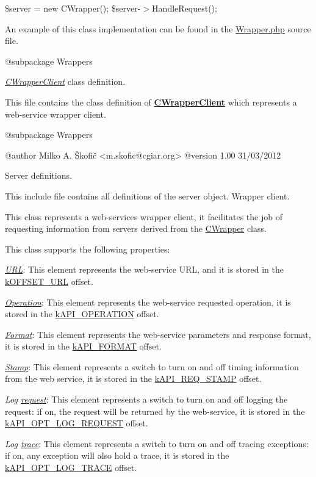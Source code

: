 {\ttfamily  \$server = new C\-Wrapper(); \$server-\/$>$Handle\-Request(); }

An example of this class implementation can be found in the \hyperlink{}{Wrapper.\-php} source file.

\begin{DoxyVerb}    @subpackage     Wrappers\end{DoxyVerb}


{\itshape \hyperlink{class_c_wrapper_client}{C\-Wrapper\-Client}} class definition.

This file contains the class definition of {\bfseries \hyperlink{class_c_wrapper_client}{C\-Wrapper\-Client}} which represents a web-\/service wrapper client.

\begin{DoxyVerb}    @subpackage     Wrappers

    @author         Milko A. Škofič <m.skofic@cgiar.org>
    @version        1.00 31/03/2012\end{DoxyVerb}


Server definitions.

This include file contains all definitions of the server object. Wrapper client.

This class represents a web-\/services wrapper client, it facilitates the job of requesting information from servers derived from the \hyperlink{class_c_wrapper}{C\-Wrapper} class.

This class supports the following properties\-:


\begin{DoxyItemize}
\item {\itshape \hyperlink{}{U\-R\-L}}\-: This element represents the web-\/service U\-R\-L, and it is stored in the \hyperlink{}{k\-O\-F\-F\-S\-E\-T\-\_\-\-U\-R\-L} offset. 
\item {\itshape \hyperlink{}{Operation}}\-: This element represents the web-\/service requested operation, it is stored in the \hyperlink{}{k\-A\-P\-I\-\_\-\-O\-P\-E\-R\-A\-T\-I\-O\-N} offset. 
\item {\itshape \hyperlink{}{Format}}\-: This element represents the web-\/service parameters and response format, it is stored in the \hyperlink{}{k\-A\-P\-I\-\_\-\-F\-O\-R\-M\-A\-T} offset. 
\item {\itshape \hyperlink{}{Stamp}}\-: This element represents a switch to turn on and off timing information from the web service, it is stored in the \hyperlink{}{k\-A\-P\-I\-\_\-\-R\-E\-Q\-\_\-\-S\-T\-A\-M\-P} offset. 
\item {\itshape Log \hyperlink{}{request}}\-: This element represents a switch to turn on and off logging the request\-: if on, the request will be returned by the web-\/service, it is stored in the \hyperlink{}{k\-A\-P\-I\-\_\-\-O\-P\-T\-\_\-\-L\-O\-G\-\_\-\-R\-E\-Q\-U\-E\-S\-T} offset. 
\item {\itshape Log \hyperlink{}{trace}}\-: This element represents a switch to turn on and off tracing exceptions\-: if on, any exception will also hold a trace, it is stored in the \hyperlink{}{k\-A\-P\-I\-\_\-\-O\-P\-T\-\_\-\-L\-O\-G\-\_\-\-T\-R\-A\-C\-E} offset. 
\end{DoxyItemize}

